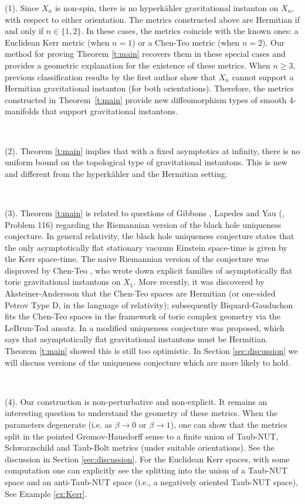 \documentclass[a4paper,11pt]{amsart}
\theoremstyle{definition}
\numberwithin{equation}{section}
\begin{document}
 (1). Since $X_n$ is non-spin, there is no hyperk\"ahler gravitational instanton on $X_n$, with respect to either orientation. The metrics constructed above are Hermitian if and only if $n\in \{1, 2\}$. In these cases, the metrics coincide with the known ones: a Euclidean Kerr metric (when $n=1$) or a Chen-Teo metric \cite{Chen-Teo} (when $n=2$). Our method for proving Theorem \ref{t:main} recovers them in these special cases and provides a geometric explanation for the existence of these metrics. When \( n \geq 3 \), previous classification results by the first author \cite{Li2} show that $X_n$ cannot support a  Hermitian gravitational instanton (for both orientations). Therefore, the metrics constructed in Theorem~\ref{t:main} provide new diffeomorphism types of smooth 4-manifolds that support gravitational instantons. 



\

(2). Theorem \ref{t:main} implies that with a fixed asymptotics at infinity, there is no uniform bound on the topological type of gravitational instantons. This is new and different from the hyperk\"ahler and the Hermitian setting. 

\

 (3). Theorem \ref{t:main} is related to  questions of Gibbons \cite{Gibbons}, Lapedes \cite{Lapedes}  and Yau (\cite{Yau1982problem}, Problem 116) regarding the Riemannian version of the black hole uniqueness conjecture. In general relativity, the  black hole uniqueness conjecture states that the only asymptotically flat stationary vacuum Einstein space-time is given by the Kerr space-time.  The naive Riemannian version of the conjecture  was disproved by Chen-Teo \cite{Chen-Teo},  who wrote down explicit families of asymptotically flat toric gravitational instantons on $X_1$. More recently, it was discovered by Aksteiner-Andersson \cite{AA} that the Chen-Teo spaces are Hermitian (or one-sided Petrov Type D, in the language of relativity); subsequently Biquard-Gauduchon \cite{BG} fits the Chen-Teo spaces in the framework of  toric complex geometry via the LeBrun-Tod ansatz. In \cite{AADNS} a modified uniqueness conjecture was proposed, which says that asymptotically flat gravitational instantons must be Hermitian. Theorem \ref{t:main} showed this is still too optimistic. In Section \ref{sec:discussion} we will discuss versions of the uniqueness conjecture which are more likely to hold. 

\

(4). Our construction is non-perturbative and non-explicit. It remains an interesting question to understand the geometry of these metrics.  When the parameters degenerate (i.e. as $\beta\rightarrow0$ or $\beta\rightarrow 1$), one can show that the metrics split in the pointed Gromov-Hausdorff sense to a finite union of Taub-NUT, Schwarzschild and Taub-Bolt metrics (under suitable orientations). See the discussion in Section \ref{sec:discussion}. For the Euclidean Kerr spaces, with some computation one can explicitly see the splitting into the union of a Taub-NUT space and an anti-Taub-NUT space (i.e., a negatively oriented Taub-NUT space), See Example \ref{ex:Kerr}.
\end{document}
